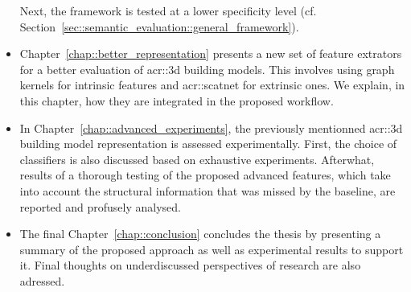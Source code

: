 \begin{itemize}[label=\(\blacktriangleright\)]
                Next, the framework is tested at a lower specificity level (cf. Section~\ref{sec::semantic_evaluation::general_framework}).
        \item Chapter~\ref{chap::better_representation} presents a new set of feature extrators for a better evaluation of \gls{acr::3d} building models.
                This involves using graph kernels for intrinsic features and \gls{acr::scatnet} for extrinsic ones.
                We explain, in this chapter, how they are integrated in the proposed workflow.
        \item In Chapter~\ref{chap::advanced_experiments}, the previously mentionned \gls{acr::3d} building model representation is assessed experimentally.
                First, the choice of classifiers is also discussed based on exhaustive experiments.
                Afterwhat, results of a thorough testing of the proposed advanced features, which take into account the structural information that was missed by the baseline, are reported and profusely analysed.
        \item The final Chapter~\ref{chap::conclusion} concludes the thesis by presenting a summary of the proposed approach as well as experimental results to support it.
                Final thoughts on underdiscussed perspectives of research are also adressed.
    \end{itemize}
